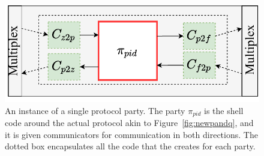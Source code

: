 \begin{figure}
	\centering
	\includegraphics[scale=0.5]{figures/singleshellmultiplex.pdf}
	\caption{An instance of a single protocol party. The party $\pi_{pid}$ is the shell code around the actual protocol akin to Figure~\ref{fig:newpandq}, and it is given communicators for communication in both directions. The dotted box encapsulates all the code that the \partywrapper creates for each party.}
	\label{fig:singlemultiplex}
	\vspace{-3mm}
\end{figure}




